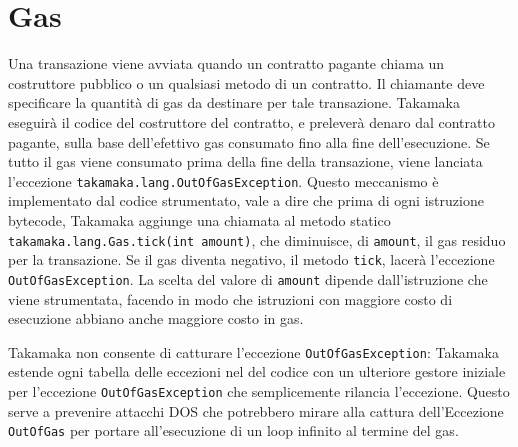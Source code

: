 \section{Gas}
Una transazione viene avviata quando un contratto pagante chiama un costruttore pubblico o un qualsiasi metodo di un contratto. Il chiamante deve specificare la quantità di gas da destinare per tale transazione. Takamaka eseguirà il codice del costruttore del contratto, e preleverà denaro dal contratto pagante, sulla base dell'efettivo gas consumato fino alla fine dell'esecuzione. Se tutto il gas viene consumato prima della fine della transazione, viene lanciata l'eccezione \lstinline|takamaka.lang.OutOfGasException|. Questo meccanismo è implementato dal codice strumentato, vale a dire che prima di ogni istruzione bytecode, Takamaka aggiunge una chiamata al metodo statico \lstinline|takamaka.lang.Gas.tick(int amount)|, che diminuisce, di \lstinline|amount|, il gas residuo per la transazione. Se il gas diventa negativo, il metodo \lstinline|tick|, lacerà l'eccezione \lstinline|OutOfGasException|. La scelta del valore di \lstinline|amount| dipende dall'istruzione che viene strumentata, facendo in modo che istruzioni con maggiore costo di esecuzione abbiano anche maggiore costo in gas.

Takamaka non consente di catturare l'eccezione \lstinline|OutOfGasException|: Takamaka estende ogni tabella delle eccezioni nel del codice con un ulteriore gestore iniziale per l'eccezione \lstinline|OutOfGasException| che semplicemente rilancia l'eccezione. Questo serve a prevenire attacchi DOS che potrebbero mirare alla cattura dell'Eccezione \lstinline|OutOfGas| per portare all'esecuzione di un loop infinito al termine del gas.

